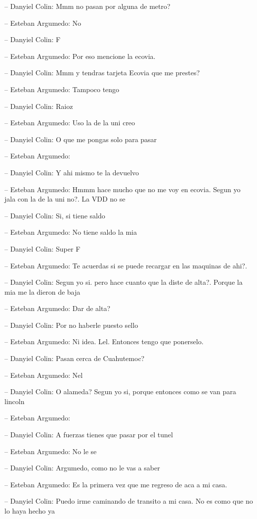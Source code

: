 -- Danyiel Colin: Mmm no pasan por alguna de metro?

-- Esteban Argumedo: No

-- Danyiel Colin: F

-- Esteban Argumedo: Por eso mencione la ecovia.

-- Danyiel Colin: Mmm y tendras tarjeta Ecovia que me prestes?

-- Esteban Argumedo: Tampoco tengo

-- Danyiel Colin: Raioz

-- Esteban Argumedo: Uso la de la uni creo

-- Danyiel Colin: O que me pongas solo para pasar

-- Esteban Argumedo:

-- Danyiel Colin: Y ahi mismo te la devuelvo

-- Esteban Argumedo: Hmmm hace mucho que no me voy en ecovia. Segun yo
jala con la de la uni no?. La VDD no se

-- Danyiel Colin: Si, si tiene saldo

-- Esteban Argumedo: No tiene saldo la mia

-- Danyiel Colin: Super F

-- Esteban Argumedo: Te acuerdas si se puede recargar en las maquinas de
ahi?.

-- Danyiel Colin: Segun yo si. pero hace cuanto que la diste de alta?.
Porque la mia me la dieron de baja

-- Esteban Argumedo: Dar de alta?

-- Danyiel Colin: Por no haberle puesto sello

-- Esteban Argumedo: Ni idea. Lel. Entonces tengo que ponerselo.

-- Danyiel Colin: Pasan cerca de Cuahutemoc?

-- Esteban Argumedo: Nel

-- Danyiel Colin: O alameda? Segun yo si, porque entonces como se van
para lincoln

-- Esteban Argumedo:

-- Danyiel Colin: A fuerzas tienes que pasar por el tunel

-- Esteban Argumedo: No le se

-- Danyiel Colin: Argumedo, como no le vas a saber

-- Esteban Argumedo: Es la primera vez que me regreso de aca a mi casa.

-- Danyiel Colin: Puedo irme caminando de transito a mi casa. No es como
que no lo haya hecho ya

